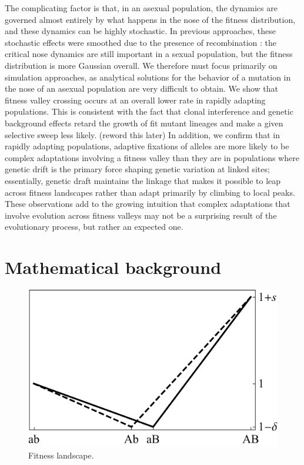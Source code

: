 \documentclass[10pt,twocolumn,twoside]{gsajnl}
\begin{document}
\begin{spacing}{1.5}
The complicating factor is that, in an asexual population, the dynamics are governed almost entirely by what happens in the nose of the fitness distribution, and these dynamics can be highly stochastic.
In previous approaches, these stochastic effects were smoothed due to the presence of recombination \citep{neher_shraiman_2011, neher_shraiman_2009}: the critical nose dynamics are still important in a sexual population, but the fitness distribution is more Gaussian overall.
We therefore must focus primarily on simulation approaches, as analytical solutions for the behavior of a mutation in the nose of an asexual population are very difficult to obtain.
We show that fitness valley crossing occurs at an overall lower rate in rapidly adapting populations.
This is consistent with the fact that clonal interference and genetic background effects retard the growth of fit mutant lineages and make a given selective sweep less likely. (reword this later)
In addition, we confirm that in rapidly adapting populations, adaptive fixations of alleles are more likely to be complex adaptations involving a fitness valley than they are in populations where genetic drift is the primary force shaping genetic variation at linked sites; essentially, genetic draft maintains the linkage that makes it possible to leap across fitness landscapes rather than adapt primarily by climbing to local peaks.
These observations add to the growing intuition that complex adaptations that involve evolution across fitness valleys may not be a surprising result of the evolutionary process, but rather an expected one.

\section{Mathematical background}

\begin{figure}[t]
\begin{center}
  \includegraphics[scale=0.75]{Figures/valley.pdf}
  \caption{Fitness landscape.}
  \label{fig:landscape}
\end{center}
\end{figure}


\end{spacing}
\end{document}
